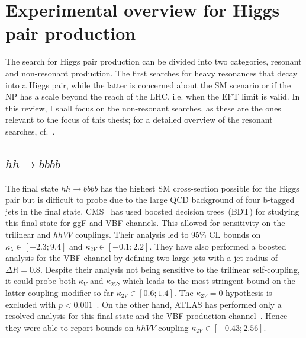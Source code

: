 \section{Experimental overview for Higgs pair production \label{exphh}  }
\par The search for Higgs pair production can be divided into two categories, resonant and non-resonant production. The first searches for heavy resonances that decay into a Higgs pair, while the latter is concerned about the SM scenario or if the NP has a scale beyond the reach of the LHC, i.e. when the EFT limit is valid. In this review, I shall focus on the non-resonant searches, as these are the ones relevant to the focus of this thesis; for a detailed overview of the resonant searches, cf.~\cite{DiMicco:2019ngk}.
%
\subsection*{$hh \to b\bar b b \bar b $}
\par The final state $ hh \to b\bar b b \bar b$ has the highest SM cross-section possible for the Higgs pair but is difficult to probe due to the large QCD background of four b-tagged jets in the final state. CMS~\cite{CMS-PAS-HIG-20-005} has used boosted decision trees~(BDT) for studying this final state for ggF and VBF channels. This allowed for sensitivity on the trilinear and $hhVV$ couplings. Their analysis led to 95\% CL bounds on $\kappa_\lambda \in [-2.3;9.4]$ and $\kappa_{2V} \in [-0.1; 2.2]$.  They have also performed a boosted analysis for the VBF channel by defining two large jets with a jet radius of $\Delta R =0.8$. Despite their analysis not being sensitive to the trilinear self-coupling, it could probe both $\kappa_V$ and  $\kappa_{2V} $, which leads to the most stringent bound on the latter coupling modifier so far  $\kappa_{2V}  \in [0.6;1.4]$. The $\kappa_{2V}=0$ hypothesis is excluded with $ p<0.001$~\cite{CMS-PAS-B2G-21-001}. On the other hand, ATLAS has performed only a resolved analysis for this final state and the VBF production channel~\cite{ATLAS:2020jgy}. Hence they were able to report bounds on $hhVV$ coupling $\kappa_{2V} \in [-0.43;2.56]$. 
